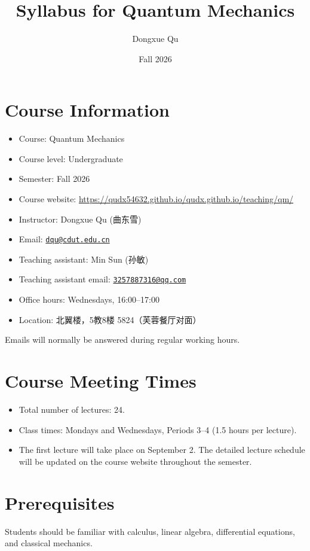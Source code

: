 \documentclass[UTF8]{ctexart}
\title{Syllabus for Quantum Mechanics}
\author{Dongxue Qu}
\date{Fall 2026}
\begin{document}
\maketitle

\section*{Course Information}
\begin{itemize}
  \item Course: Quantum Mechanics
  \item Course level: Undergraduate
  \item Semester: Fall 2026
  \item Course website: \href{https://qudx54632.github.io/qudx.github.io/teaching/qm/}{https://qudx54632.github.io/qudx.github.io/teaching/qm/}
  \item Instructor: Dongxue Qu (曲东雪)
  \item Email: \href{mailto:dqu@cdut.edu.cn}{\texttt{dqu@cdut.edu.cn}}
  \item Teaching assistant: Min Sun (孙敏)
  \item Teaching assistant email: \href{mailto:3257887316@qq.com}{\texttt{3257887316@qq.com}}
  \item Office hours: Wednesdays, 16:00--17:00
  \item Location: 北翼楼，5教8楼 5824（芙蓉餐厅对面）
\end{itemize}

Emails will normally be answered during regular working hours.

\section*{Course Meeting Times}
\begin{itemize}
  \item Total number of lectures: 24.
  \item Class times: Mondays and Wednesdays, Periods 3--4 (1.5 hours per lecture).
  \item The first lecture will take place on September 2. The detailed lecture schedule will be updated on the course website throughout the semester.
\end{itemize}

\section*{Prerequisites}
Students should be familiar with calculus, linear algebra, differential equations, and classical mechanics.
\end{document}
